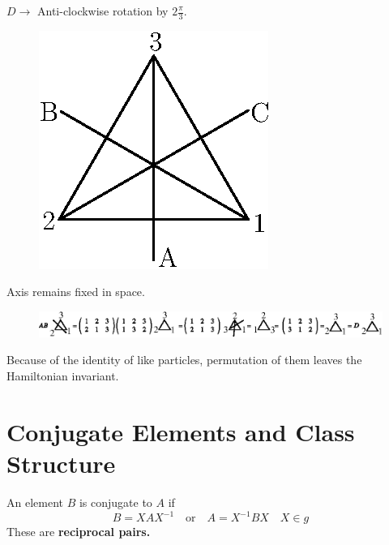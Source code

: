 \begin{example*}
$D\to$ Anti-clockwise rotation by $2\frac{\pi}{3}$.
\begin{figure}[H]
\centering
\includegraphics{images/lecture4/fig4.eps}
\end{figure}
Axis remains fixed in space.
\begin{figure}[H]
\centering
\includegraphics{images/lecture4/fig5.eps}
\end{figure}

Because of the identity of like particles, permutation of them leaves the Hamiltonian invariant.
\end{example*}

\section*{Conjugate Elements and Class Structure}

An element $B$ is conjugate to $A$ if
$$
B=XAX^{-1}\quad\text{or}\quad A=X^{-1}BX\quad X\in g
$$
These are {\bf reciprocal pairs.}

